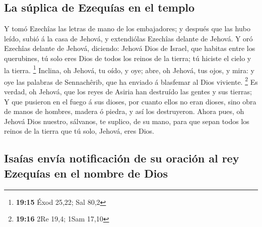 \hypertarget{la-suxfaplica-de-ezequuxedas-en-el-templo}{%
\subsection{La súplica de Ezequías en el
templo}\label{la-suxfaplica-de-ezequuxedas-en-el-templo}}

 Y tomó Ezechîas las letras de mano de los embajadores; y
después que las hubo leído, subió á la casa de Jehová, y extendiólas
Ezechîas delante de Jehová.  Y oró Ezechîas delante de
Jehová, diciendo: Jehová Dios de Israel, que habitas entre los
querubines, tú solo eres Dios de todos los reinos de la tierra; tú
hiciste el cielo y la tierra. \footnote{\textbf{19:15} Éxod 25,22; Sal
  80,2}  Inclina, oh Jehová, tu oído, y oye; abre, oh
Jehová, tus ojos, y mira: y oye las palabras de Sennachêrib, que ha
enviado á blasfemar al Dios viviente. \footnote{\textbf{19:16} 2Re 19,4;
  1Sam 17,10}  Es verdad, oh Jehová, que los reyes de
Asiria han destruído las gentes y sus tierras;  Y que
pusieron en el fuego á sus dioses, por cuanto ellos no eran dioses, sino
obra de manos de hombres, madera ó piedra, y así los destruyeron.
 Ahora pues, oh Jehová Dios nuestro, sálvanos, te
suplico, de su mano, para que sepan todos los reinos de la tierra que tú
solo, Jehová, eres Dios.

\hypertarget{isauxedas-envuxeda-notificaciuxf3n-de-su-oraciuxf3n-al-rey-ezequuxedas-en-el-nombre-de-dios}{%
\subsection{Isaías envía notificación de su oración al rey Ezequías en
el nombre de
Dios}\label{isauxedas-envuxeda-notificaciuxf3n-de-su-oraciuxf3n-al-rey-ezequuxedas-en-el-nombre-de-dios}}

